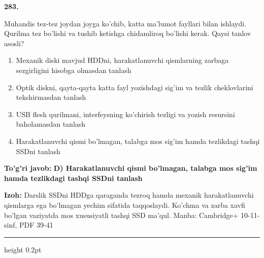 \documentclass[10pt,a4paper]{article}
\begin{document}
{\bfseries\sffamily\color{ink} 283.}
\par
Muhandis tez-tez joydan joyga ko'chib, katta ma'lumot fayllari bilan ishlaydi. Qurilma tez bo'lishi va tushib ketishga chidamliroq bo'lishi kerak. Qaysi tanlov asosli?
\begin{enumerate}[label=\Alph*),leftmargin=9mm]
\item Mexanik diski mavjud HDDni, harakatlanuvchi qismlarning zarbaga sezgirligini hisobga olmasdan tanlash
\item Optik diskni, qayta-qayta katta fayl yozishdagi sig'im va tezlik cheklovlarini tekshirmasdan tanlash
\item USB flesh qurilmani, interfeysning ko'chirish tezligi va yozish resursini baholamasdan tanlash
\item Harakatlanuvchi qismi bo'lmagan, talabga mos sig'im hamda tezlikdagi tashqi SSDni tanlash
\end{enumerate}
\begin{tcolorbox}[enhanced,breakable,colback=teal!4,colframe=teal!60!black,boxrule=0.45pt,arc=1.2mm,left=2.7mm,right=2.7mm,top=1.8mm,bottom=1.8mm,before skip=2mm,after skip=2mm]
{\bfseries\sffamily\color{teal}To'g'ri javob:} \textbf{D) Harakatlanuvchi qismi bo'lmagan, talabga mos sig'im hamda tezlikdagi tashqi SSDni tanlash}
\par\smallskip
{\bfseries Izoh:} Darslik SSDni HDDga qaraganda tezroq hamda mexanik harakatlanuvchi qismlarga ega bo'lmagan yechim sifatida taqqoslaydi. Ko'chma va zarba xavfi bo'lgan vaziyatda mos xususiyatli tashqi SSD ma'qul. Manba: Cambridge+ 10-11-sinf, PDF 39-41
\end{tcolorbox}
\vspace{2mm}\hrule height 0.2pt\vspace{3mm}
\end{document}
